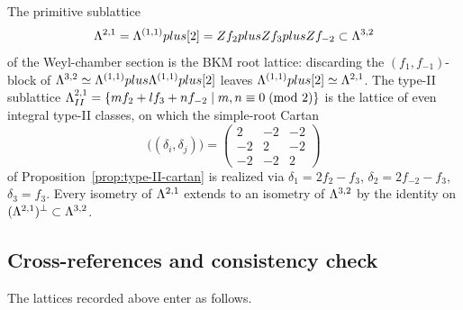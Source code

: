 \begin{remark}
\label{rem:II21-in-32}
The primitive sublattice
\[
\Lambda^{2,1}=\Lambda^{(1,1)}plus[2]
=Z f_2plusZ f_3plusZ f_{-2}\subset\Lambda^{3,2}
\]
of the Weyl-chamber section is the BKM root lattice: discarding the
$(f_1,f_{-1})$-block of $\Lambda^{3,2}\simeq\Lambda^{(1,1)}plus\Lambda^{(1,1)}plus
[2]$ leaves $\Lambda^{(1,1)}plus[2]\simeq\Lambda^{2,1}$.  The type-II
sublattice $\Lambda_{II}^{2,1}=\{mf_2+lf_3+nf_{-2}\mid
m,n\equiv 0\!\pmod 2\}$ is the lattice of even integral type-II
classes, on which the simple-root Cartan
\[
\bigl((\delta_i,\delta_j)\bigr)
=\begin{pmatrix}2&-2&-2\\-2&2&-2\\-2&-2&2\end{pmatrix}
\]
of Proposition~\ref{prop:type-II-cartan} is realized via
$\delta_1=2f_2-f_3$, $\delta_2=2f_{-2}-f_3$, $\delta_3=f_3$.  Every
isometry of $\Lambda^{2,1}$ extends to an isometry of $\Lambda^{3,2}$ by
the identity on $(\Lambda^{2,1})^\perp\subset\Lambda^{3,2}$.
\end{remark}

\subsection{Cross-references and consistency check}
\label{app:lattice-cross-refs}

The lattices recorded above enter as follows.

